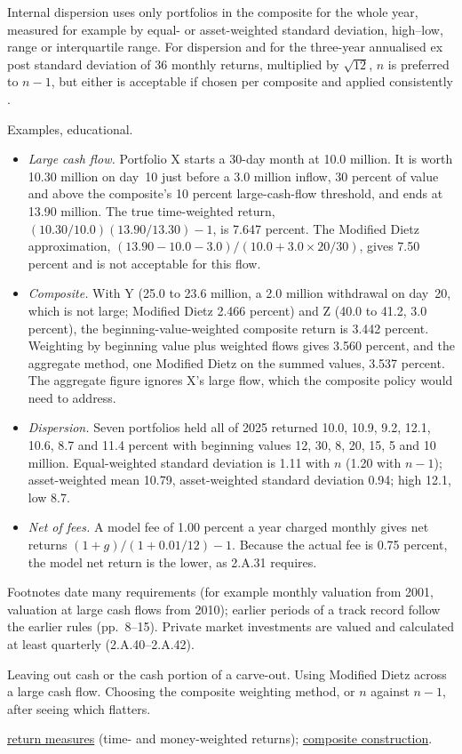 \begin{qfmethod}
\begin{itemize}
\end{itemize}
Internal dispersion uses only portfolios in the composite for the whole year, measured for example by equal- or asset-weighted standard deviation, high--low, range or interquartile range. For dispersion and for the three-year annualised ex post standard deviation of 36 monthly returns, multiplied by $\sqrt{12}$, $n$ is preferred to $n-1$, but either is acceptable if chosen per composite and applied consistently \citep[Provisions 4.A.1(i)--(j), pp.~196--200]{gips-handbook-firms-2020}.

 Examples, educational.
\begin{itemize}
\item \emph{Large cash flow.} Portfolio X starts a 30-day month at 10.0 million. It is worth 10.30 million on day~10 just before a 3.0 million inflow, 30 percent of value and above the composite's 10 percent large-cash-flow threshold, and ends at 13.90 million. The true time-weighted return, $(10.30/10.0)(13.90/13.30)-1$, is 7.647 percent. The Modified Dietz approximation, $(13.90-10.0-3.0)/(10.0+3.0\times20/30)$, gives 7.50 percent and is not acceptable for this flow.
\item \emph{Composite.} With Y (25.0 to 23.6 million, a 2.0 million withdrawal on day~20, which is not large; Modified Dietz 2.466 percent) and Z (40.0 to 41.2, 3.0 percent), the beginning-value-weighted composite return is 3.442 percent. Weighting by beginning value plus weighted flows gives 3.560 percent, and the aggregate method, one Modified Dietz on the summed values, 3.537 percent. The aggregate figure ignores X's large flow, which the composite policy would need to address.
\item \emph{Dispersion.} Seven portfolios held all of 2025 returned 10.0, 10.9, 9.2, 12.1, 10.6, 8.7 and 11.4 percent with beginning values 12, 30, 8, 20, 15, 5 and 10 million. Equal-weighted standard deviation is 1.11 with $n$ (1.20 with $n-1$); asset-weighted mean 10.79, asset-weighted standard deviation 0.94; high 12.1, low 8.7.
\item \emph{Net of fees.} A model fee of 1.00 percent a year charged monthly gives net returns $(1+g)/(1+0.01/12)-1$. Because the actual fee is 0.75 percent, the model net return is the lower, as 2.A.31 requires.
\end{itemize}

 Footnotes date many requirements (for example monthly valuation from 2001, valuation at large cash flows from 2010); earlier periods of a track record follow the earlier rules (pp.~8--15). Private market investments are valued and calculated at least quarterly (2.A.40--2.A.42).

 Leaving out cash or the cash portion of a carve-out. Using Modified Dietz across a large cash flow. Choosing the composite weighting method, or $n$ against $n-1$, after seeing which flatters.

 \hyperref[def:return-measures]{return measures} (time- and money-weighted returns); \hyperref[meth:gips-composite-membership]{composite construction}.

\end{qfmethod}

